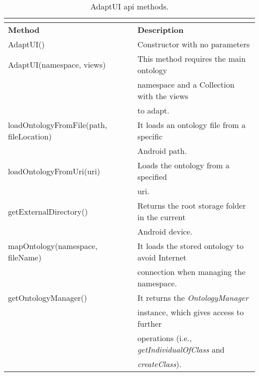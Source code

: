 \begin{center}
\footnotesize
\begin{longtable}{l l}
  \caption{AdaptUI \ac{api} methods.}\\
  \label{tbl:api} \\
  \hline 
  \textbf{Method}				& \textbf{Description}\\
  \hline
  AdaptUI()					& Constructor with no parameters		\\
  AdaptUI(namespace, views)			& This method requires the main ontology 	\\
						& namespace and a Collection with the views	\\
						& to adapt.					\\
  loadOntologyFromFile(path, fileLocation)	& It loads an ontology file from a specific 	\\
						& Android path.					\\
  loadOntologyFromUri(uri)			& Loads the ontology from a specified 		\\
						& \ac{uri}.					\\
  getExternalDirectory()			& Returns the root storage folder in the current\\
						& Android device.				\\
  mapOntology(namespace, fileName)		& It loads the stored ontology to avoid Internet\\
						& connection when managing the namespace.	\\
  getOntologyManager()				& It returns the \textit{OntologyManager} 	\\
						& instance, which gives access to further 	\\
						& operations (i.e., \textit{getIndividualOfClass} and \\
						& \textit{createClass}).			\\
  \hline
\end{longtable}
\end{center}


